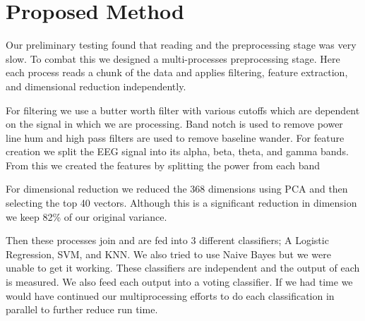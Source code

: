 \section{Proposed Method}
\label{sec:proposed_method}

Our preliminary testing found that reading and the preprocessing stage
was very slow.
To combat this we designed a multi-processes preprocessing stage.
Here each process reads a chunk of the data and applies filtering,
feature extraction, and dimensional reduction independently.

For filtering we use a butter worth filter with various cutoffs which are dependent on the signal in which we are processing.
Band notch is used to remove power line hum and high pass filters are used to remove
baseline wander.
For feature creation we split the EEG signal into its alpha, beta, theta, and gamma bands.
From this we created the features by splitting the power from each band

For dimensional reduction we reduced the 368 dimensions using PCA
and then selecting the top 40 vectors.
Although this is a significant reduction in dimension we keep 82\% of our
original variance.

Then these processes join and are fed into 3 different classifiers;
A Logistic Regression, SVM, and KNN.
We also tried to use Naive Bayes but we were unable to get it working.
These classifiers are independent and the output of each is measured.
We also feed each output into a voting classifier.
If we had time we would have continued our multiprocessing efforts to do each
classification in parallel to further reduce run time.
